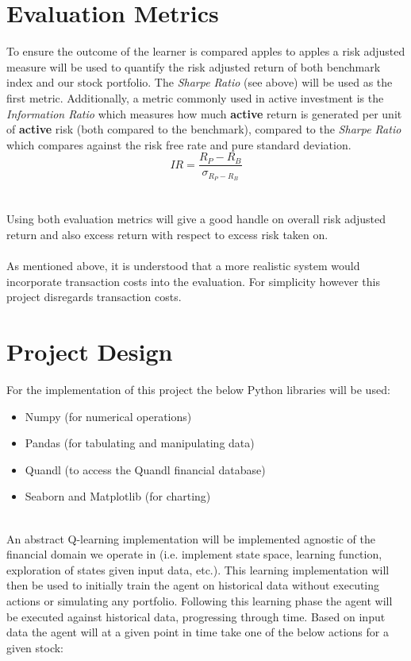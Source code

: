 \documentclass[dvips,12pt]{article}
\begin{document}
\section{Evaluation Metrics}
To ensure the outcome of the learner is compared apples to apples a risk adjusted measure will be used to quantify the risk adjusted return of both benchmark index and our stock portfolio. The \emph{Sharpe Ratio} (see above) will be used as the first metric. Additionally, a metric commonly used in active investment is the \emph{Information Ratio} which measures how much  \textbf{active} return is generated per unit of \textbf{active} risk (both compared to the benchmark), compared to the \emph{Sharpe Ratio} which compares against the risk free rate and pure standard deviation. 
\begin{equation}
	IR = \frac{R_P - R_B}{\sigma_{R_P - R_B}}
\end{equation}
~\\\\
Using both evaluation metrics will give a good handle on overall risk adjusted return and also excess return with respect to excess risk taken on.
\\\\
As mentioned above, it is understood that a more realistic system would incorporate transaction costs into the evaluation. For simplicity however this project disregards transaction costs.

\section{Project Design}
For the implementation of this project the below Python libraries will be used:

\begin{itemize}
	\item Numpy (for numerical operations)
	\item Pandas (for tabulating and manipulating data)
	\item Quandl (to access the Quandl financial database)
	\item Seaborn and Matplotlib (for charting)
\end{itemize}
~\\
An abstract Q-learning implementation will be implemented agnostic of the financial domain we operate in (i.e. implement state space, learning function, exploration of states given input data, etc.). This learning implementation will then be used to initially train the agent on historical data without executing actions or simulating any portfolio. Following this learning phase the agent will be executed against historical data, progressing through time. Based on input data the agent will at a given point in time take one of the below actions for a given stock:
\end{document}
